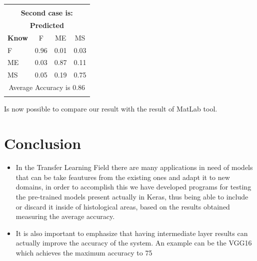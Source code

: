 \documentclass[12pt]{article} %
\begin{document}
\begin{minipage}{0.5\textwidth}
\begin{center}
\begin{tabular}{l|c|c|c|}
\multicolumn{4}{c}{}\\
 \multicolumn{4}{c}{ \textbf{Second case is:}}\\
 \multicolumn{4}{c}{ \textbf{ Predicted}}\\
 \textbf{Know}&F&ME&MS\\ \hline\hline
F   &0.96&0.01&0.03\\
ME &0.03&0.87&0.11\\
MS &0.05&0.19&0.75\\
\multicolumn{4}{c}{Average Accuracy is 0.86}\\
\multicolumn{4}{c}{}\\
\end{tabular}
\end{center}
\end{minipage}
Is now possible to compare our result with the result of MatLab tool.

\newpage

\section {Conclusion}

\begin{itemize}
\item In the Transfer Learning Field there are many applications in need of models that can be take feautures from the existing ones and adapt it to new domains, in order to accomplish this we have developed programs for testing the pre-trained models present actually in Keras, thus being able to include or discard it inside of histological areas, based on the results obtained measuring the average accuracy.

\item It is also important to emphasize that having intermediate layer results can actually improve the accuracy of the system. An example can be the VGG16 which achieves the maximum accuracy to 75%

\end{itemize}
\end{document}
